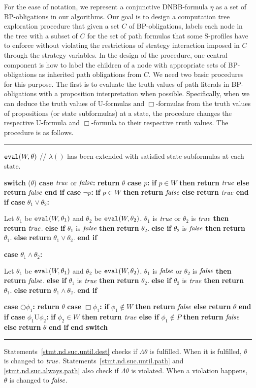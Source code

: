 \documentclass[11pt]{article}
\makeatletter
\newcommand{\IFNLINE}[1]{\STATE {\bf if} #1 {\bf then} }
\newcommand{\IFLINE}[1]{{\bf if} #1 {\bf then} }
\newcommand{\ELSELINE}{\textbf{else} }
\newcommand{\ENDIFLINE}{\textbf{end if}}
\newcommand{\ENDIFNLINE}{\STATE \textbf{end if}}
\newcommand{\ELSIFLINE}[1]{\textbf{else if} #1 {\bf then}}
\newcommand{\ELSIFNLINE}[1]{\STATE \textbf{else if} #1 {\bf then}}
\newcommand{\RETLINE}{\textbf{return} }
\newcommand{\SWITCH}[1]{\STATE \textbf{switch} (#1)}
\newcommand{\ENDSWITCH}{\STATE \textbf{end switch}}
\newcommand{\CASE}[1]{\STATE \textbf{case} #1\textbf{:} \begin{ALC@g}}
\newcommand{\ENDCASE}{\end{ALC@g}}
\newcommand{\CASELINE}[1]{\STATE \textbf{case} #1\textbf{:} }
\newcommand{\procbegin}{\vspace*{3mm}\hrule\noindent}
\newcommand{\procend}{\vspace*{1mm}\hrule\vspace{3mm}}
\newcommand{\tteval}{\mbox{\tt eval}}
\newcommand{\true}{\mbox{\em true}}
\newcommand{\false}{\mbox{\em false}}
\newcommand{\pfrr}{\Box}
\newcommand{\until}{\textrm{U}} %
\newcommand{\nxt}{\bigcirc}
\makeatother
\begin{document}
For the ease of notation, we represent 
a conjunctive DNBB-formula $\eta$ as a set of BP-obligations in our algorithms.  
Our goal is to design a computation tree exploration procedure
that given a set $C$ of BP-obligations, 
labels each node in the tree with a subset of $C$
for the set of path formulas that some S-profiles
have to enforce without violating the restrictions of strategy
interaction imposed in $C$ through the strategy variables.
In the design of the procedure, one central component is
how to label the children of a node with appropriate sets of BP-obligations 
as inherited path obligations from $C$. 
We need two basic procedures for this purpose. 
The first is to evaluate the truth values of path literals in 
BP-obligations with a proposition interpretation when possible. 
Specifically, when we can deduce the truth values of 
$\until$-formulas and $\pfrr$-formulas from the truth values of propositions (or state subformulas) at a state, 
the procedure changes the respective $\until$-formula and $\pfrr$-formula to their  respective truth values. 
The procedure is as follows. 
\procbegin 
$\tteval(W,\theta)$ // $\lambda()$ has been extended with 
			satisfied state subformulas at each state. 
\begin{algorithmic}[1]
\SWITCH {$\theta$} 
\CASELINE {$\true$ or $\false$} 
  \RETLINE $\theta$
\CASELINE {$p$} 
  \IFLINE {$p\in W$} \RETLINE $\true$ 
  \ELSELINE \RETLINE $\false$ 
  \ENDIFLINE   
\CASELINE {$\neg p$} 
  \IFLINE {$p\in W$} \RETLINE $\false$ 
  \ELSELINE \RETLINE $\true$  
  \ENDIFLINE   
\CASE {$\theta_1\vee\theta_2$} 
  \STATE Let $\theta_1$ be $\tteval(W,\theta_1)$ and 
    $\theta_2$ be $\tteval(W,\theta_2)$. 
  \IFNLINE {$\theta_1$ is $\true$ or $\theta_2$ is $\true$} 
    \RETLINE $\true$. 
  \ELSIFNLINE {$\theta_1$ is $\false$}
    \RETLINE $\theta_2$. 
  \ELSIFLINE {$\theta_2$ is $\false$} 
    \RETLINE $\theta_1$. 
  \ELSELINE 
    \RETLINE $\theta_1\vee\theta_2$. 
  \ENDIFNLINE 
\ENDCASE
\CASE {$\theta_1\wedge\theta_2$} 
  \STATE Let $\theta_1$ be $\tteval(W,\theta_1)$ and 
    $\theta_2$ be $\tteval(W,\theta_2)$. 
  \IFNLINE {$\theta_1$ is $\false$ or $\theta_2$ is $\false$} 
    \RETLINE $\false$. 
  \ELSIFNLINE {$\theta_1$ is $\true$}
    \RETLINE $\theta_2$. 
  \ELSIFLINE {$\theta_2$ is $\true$} 
    \RETLINE $\theta_1$. 
  \ELSELINE 
    \RETLINE $\theta_1\wedge\theta_2$. 
  \ENDIFNLINE  
\ENDCASE 
\CASELINE {$\nxt\phi_1$} 
  \RETLINE $\theta$
\CASELINE {$\pfrr\phi_1$} \label{stmt.nd.suc.always.path}
  \IFLINE {$\phi_1\not\in W$} 
    \RETLINE $\false$ 
  \ELSELINE 
    \RETLINE $\theta$
  \ENDIFLINE 
\CASELINE {$\phi_1\until\phi_2$} 
  \IFLINE {$\phi_2\in W$} \label{stmt.nd.suc.until.dest}
    \RETLINE $\true$
  \ELSIFLINE {$\phi_1\not\in P$}\label{stmt.nd.suc.until.path}
    \RETLINE $\false$
  \ELSELINE
    \RETLINE $\theta$
  \ENDIFLINE 
\ENDSWITCH 
\end{algorithmic}
\procend 
Statements~\ref{stmt.nd.suc.until.dest} 
checks if $\Lambda\theta$ is fulfilled.
When it is fulfilled, 
$\theta$ is changed to $\true$.   
Statements~\ref{stmt.nd.suc.until.path} 
and \ref{stmt.nd.suc.always.path} also 
check if $\Lambda\theta$ is violated.
When a violation happens, 
$\theta$ is changed to $\false$.   
\end{document}
